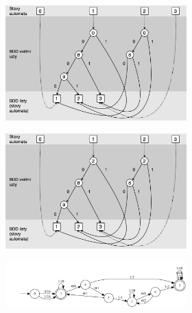 \begin{figure}[h]
\begin{subfigure}{.99\textwidth}
\begin{subfigure}{.49\textwidth}
        \includegraphics[scale=0.21]{obrazky-figures/exp0_0.png}
            \caption{}
            \label{exp0_img2}
        \end{subfigure}
        \hfil
        \begin{subfigure}{.49\textwidth}
            \centering
            \includegraphics[scale=0.21]{obrazky-figures/exp0_1.png}
            \caption{}
            \label{exp0_img3}
        \end{subfigure}
    \end{subfigure} 
    \vfil
    \begin{subfigure}{.99\textwidth}
        \centering 
        \begin{subfigure}{.49\textwidth}
            \centering
            \includegraphics[scale=0.22]{obrazky-figures/exp0_0_we_aut.png}

\end{subfigure}
\end{subfigure}
\end{figure}
